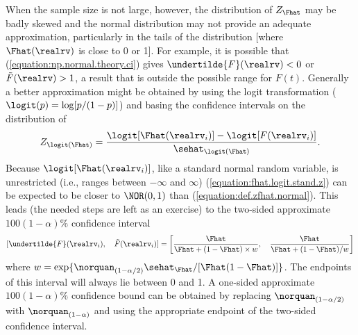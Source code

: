 When the sample size is not large, however, the distribution of
$Z_{\Fhat}$ may be badly skewed and the normal distribution may not
provide an adequate approximation, particularly in
the tails of the distribution [where $\Fhat(\realrv)$ is close to 0
or 1].  For example, it is possible that 
(\ref{equation:np.normal.theory.ci}) gives 
$\undertilde{F}(\realrv) < 0$ or $\tilde{F}(\realrv) > 1$, a
result that is outside the possible range for $F(t)$. Generally
a better approximation might be obtained by using the logit
transformation ($\logit(p)=\log[p/(1-p)]$) and basing the confidence
intervals on the distribution of
\begin{equation}
\label{equation:fhat.logit.stand.z}
Z_{\logit(\Fhat)} = \frac{\logit[\Fhat(\realrv_{i})]-\logit
[F(\realrv_{i})]}
{\sehat_{\logit(\Fhat)}}.
\end{equation}
Because $\logit[\Fhat(\realrv_{i})]$, like a standard normal
random variable, is unrestricted (i.e.,  ranges between $-\infty$ and
$\infty$) (\ref{equation:fhat.logit.stand.z}) can be expected to be 
closer to $\NOR(0,1)$ than (\ref{equation:def.zfhat.normal}).  This leads
(the needed steps are left as an exercise)
to the two-sided approximate $100(1-\alpha)\%$ confidence interval
\begin{equation}
\label{equation:fhat.logit.ci}
[\undertilde{F}(\realrv_{i}), \quad \tilde{F}(\realrv_{i})] = 
\left[\frac{\Fhat}{\Fhat
+(1-\Fhat) \times w},  \quad \frac{\Fhat}{\Fhat+
(1-\Fhat)/w}
\right]
\end{equation}
where
$w=\exp\{\norquan_{(1-\alpha/2)}\sehat_{\Fhat}/
[\Fhat(1-\Fhat)]\}$. The endpoints of this interval
will always lie between 0 and 1.
A one-sided approximate $100(1-\alpha)\%$
confidence bound can be obtained by replacing
$\norquan_{(1-\alpha/2)}$ with $\norquan_{(1-\alpha)}$ and using the
appropriate endpoint of the two-sided confidence interval.

